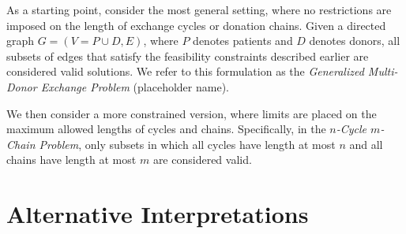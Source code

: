 As a starting point, consider the most general setting, where no restrictions are imposed on the length of exchange cycles or donation chains. Given a directed graph $G = (V = P \cup D, E)$, where $P$ denotes patients and $D$ denotes donors, all subsets of edges that satisfy the feasibility constraints described earlier are considered valid solutions. We refer to this formulation as the \textit{Generalized Multi-Donor Exchange Problem} (placeholder name).

We then consider a more constrained version, where limits are placed on the maximum allowed lengths of cycles and chains. Specifically, in the \textit{$n$-Cycle $m$-Chain Problem}, only subsets in which all cycles have length at most $n$ and all chains have length at most $m$ are considered valid.



\section{Alternative Interpretations}





